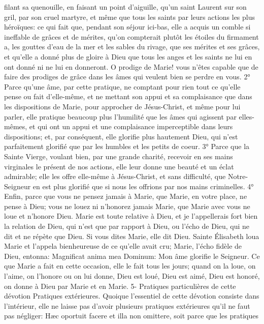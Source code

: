 filant sa quenouille, en faisant un point d'aiguille, qu'un saint Laurent sur son gril, par son cruel martyre, et même
que tous les saints par leurs actions les plus héroïques: ce qui fait que, pendant son séjour ici-bas, elle a acquis un
comble si ineffable de grâces et de mérites, qu'on compterait plutôt les étoiles du firmament a, les gouttes d'eau de
la mer et les sables du rivage, que ses mérites et ses grâces, et qu'elle a donné plus de gloire à Dieu que tous les
anges et les saints ne lui en ont donné ni ne lui en donneront. O prodige de Marie! vous n'êtes capable que de
faire des prodiges de grâce dans les âmes qui veulent bien se perdre en vous.
 2° Parce qu'une âme, par cette pratique, ne comptant pour rien tout ce qu'elle pense ou fait d'elle-même, et
ne mettant son appui et sa complaisance que dans les dispositions de Marie, pour approcher de Jésus-Christ, et
même pour lui parler, elle pratique beaucoup plus l'humilité que les âmes qui agissent par elles-mêmes, et qui ont
un appui et une complaisance imperceptible dans leurs dispositions; et, par conséquent, elle glorifie plus
hautement Dieu, qui n'est parfaitement glorifié que par les humbles et les petits de coeur.
 3° Parce que la Sainte Vierge, voulant bien, par une grande charité, recevoir en ses mains virginales le
présent de nos actions, elle leur donne une beauté et un éclat admirable; elle les offre elle-même à Jésus-Christ,
et sans difficulté, que Notre-Seigneur en est plus glorifié que si nous les offrions par nos mains criminelles.
 4° Enfin, parce que vous ne pensez jamais à Marie, que Marie, en votre place, ne pense à Dieu; vous ne
louez ni n'honorez jamais Marie, que Marie avec vous ne loue et n'honore Dieu. Marie est toute relative à Dieu, et
je l'appellerais fort bien la relation de Dieu, qui n'est que par rapport à Dieu, ou l'écho de Dieu, qui ne dit et ne
répète que Dieu. Si vous dites Marie, elle dit Dieu. Sainte Élisabeth loua Marie et l'appela bienheureuse de ce
qu'elle avait cru; Marie, l'écho fidèle de Dieu, entonna: Magnificat anima mea Dominum: Mon âme glorifie le
Seigneur. Ce que Marie a fait en cette occasion, elle le fait tous les jours; quand on la loue, on l'aime, on l'honore
ou on lui donne, Dieu est loué, Dieu est aimé, Dieu est honoré, on donne à Dieu par Marie et en Marie.
5- Pratiques particulières de cette dévotion
Pratiques extérieures.
 Quoique l'essentiel de cette dévotion consiste dans l'intérieur, elle ne laisse pas d'avoir plusieurs pratiques
extérieures qu'il ne faut pas négliger: Hæc oportuit facere et illa non omittere, soit parce que les pratiques
